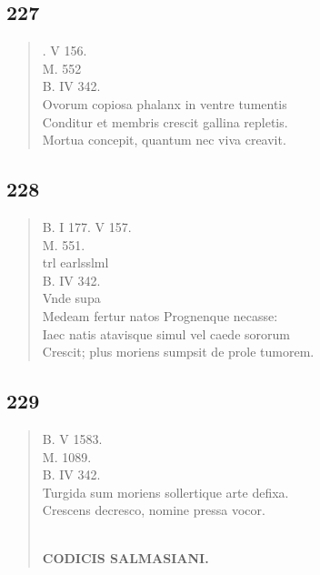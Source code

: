\documentclass[11pt, a4paper]{report}
\begin{document}
            \subsection*{227}
      \begin{verse}
      . V 156. \\ M. 552 \\ B. IV 342. \\ Ovorum copiosa phalanx in ventre tumentis \\ Conditur et membris crescit gallina repletis. \\ Mortua concepit, quantum nec viva creavit. \\ 
      \end{verse}
  
            \subsection*{228}
      \begin{verse}
      B. I 177. V 157. \\ M. 551. \\ trl earlsslml \\ B. IV 342. \\ Vnde supa \\ Medeam fertur natos Prognenque necasse: \\ Iaec natis atavisque simul vel caede sororum \\ Crescit; plus moriens sumpsit de prole tumorem. \\ 
      \end{verse}
  
            \subsection*{229}
      \begin{verse}
      B. V 1583. \\ M. 1089. \\ B. IV 342. \\ Turgida sum moriens sollertique arte defixa. \\ Crescens decresco, nomine pressa vocor. \\ 
        ﻿\pagebreak 
    \begin{center} \textbf{CODICIS SALMASIANI.} \end{center} \marginpar{[191]} 
      \end{verse}
  
\end{document}
